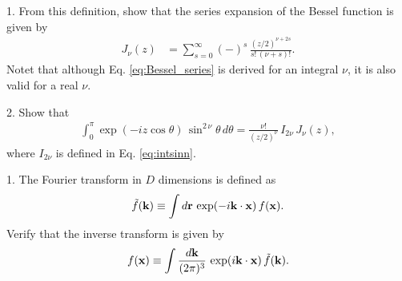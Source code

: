 \documentclass{book}
\begin{document}
1. From this definition,
show that the series expansion of the Bessel function
is given by
\begin{align}
  J_\nu(z)
&=
  \sum_{s = 0}^\infty
  (-)^s \, \frac{ (z/2)^{\nu + 2 s} } { s! \, (\nu + s)! }.
  \label{eq:Bessel_series}
\end{align}
Notet that although Eq. \eqref{eq:Bessel_series}
is derived for an integral $\nu$,
it is also valid for a real $\nu$.



2. Show that
\begin{align}
  \int_0^\pi \exp( - i z \cos \theta) \, \sin^{2\,\nu} \theta \, d\theta
=
  \frac{ \nu! }{ (z/2)^\nu } \, I_{2\nu} \, J_\nu(z),
  \label{eq:intexpsin}
\end{align}
where $I_{2\nu}$ is defined in Eq. \eqref{eq:intsinn}.







1. The Fourier transform in $D$ dimensions is defined as
\begin{equation}
  \tilde f(\boldsymbol{\mathbf{k}})
\equiv
  \int d\boldsymbol{\mathbf{r}} \, \exp(-i\boldsymbol{\mathbf{k}} \cdot \boldsymbol{\mathbf{x}}) \, f(\boldsymbol{\mathbf{x}}).
  \label{eq:FourierTransform}
\end{equation}
Verify that the inverse transform is given by
\begin{equation}
  f(\boldsymbol{\mathbf{x}})
\equiv
  \int \frac{ d \boldsymbol{\mathbf{k}} }{(2\pi)^3} \, \exp(i\boldsymbol{\mathbf{k}} \cdot \boldsymbol{\mathbf{x}}) \, \tilde f(\boldsymbol{\mathbf{k}}).
  \label{eq:inverseFourierTransform}
\end{equation}

\end{document}

